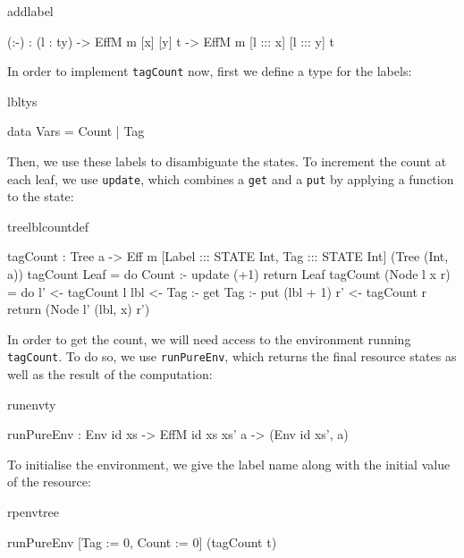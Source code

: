 \begin{SaveVerbatim}{addlabel}

(:-) : (l : ty) -> EffM m [x] [y] t -> 
                   EffM m [l ::: x] [l ::: y] t

\end{SaveVerbatim}

\noindent
In order to implement \texttt{tagCount} now, first we define a type for the
labels:

\begin{SaveVerbatim}{lbltys}

data Vars = Count | Tag

\end{SaveVerbatim}

\noindent
Then, we use these labels to disambiguate the states. To increment the count
at each leaf, we use \texttt{update}, which combines a \texttt{get} and a
\texttt{put} by applying a function to the state:

\begin{SaveVerbatim}{treelblcountdef}

tagCount : Tree a -> Eff m [Label ::: STATE Int, 
                            Tag   ::: STATE Int] 
                              (Tree (Int, a))
tagCount Leaf
     = do Count :- update (+1)
          return Leaf
tagCount (Node l x r) 
     = do l' <- tagCount l
          lbl <- Tag :- get
          Tag :- put (lbl + 1)
          r' <- tagCount r
          return (Node l' (lbl, x) r')

\end{SaveVerbatim}

\noindent
In order to get the count, we will need access to the environment 
running \texttt{tagCount}. To do so, we use \texttt{runPureEnv}, which returns
the final resource states as well as the result of the computation:

\begin{SaveVerbatim}{runenvty}

runPureEnv : Env id xs -> 
             EffM id xs xs' a -> (Env id xs', a)

\end{SaveVerbatim}

\noindent
To initialise the environment, we give the label name along with the initial
value of the resource:

\begin{SaveVerbatim}{rpenvtree}

runPureEnv [Tag := 0, Count := 0] (tagCount t) 

\end{SaveVerbatim}


